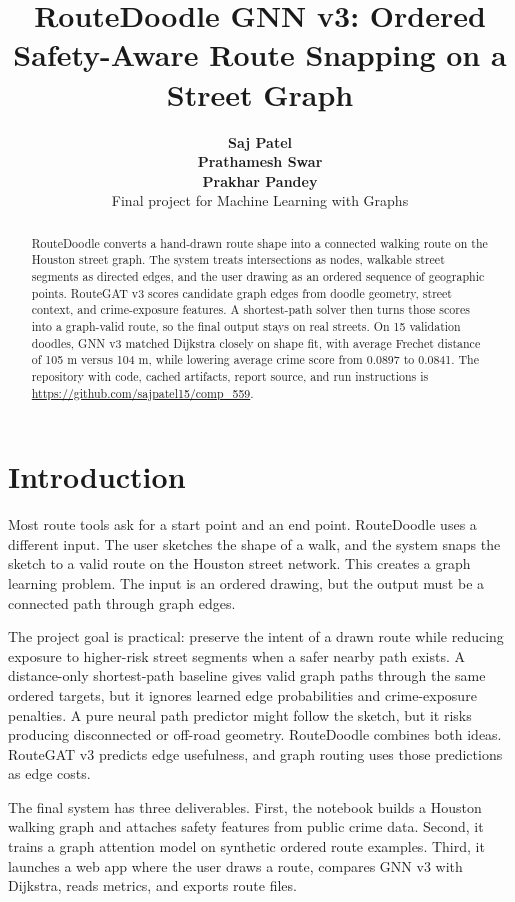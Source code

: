 \documentclass{article}
\title{RouteDoodle GNN v3: Ordered Safety-Aware Route Snapping on a Street Graph}
\author{%
  \textbf{Saj Patel} \\
  \textbf{Prathamesh Swar} \\
  \textbf{Prakhar Pandey} \\
  {\normalfont Final project for Machine Learning with Graphs}
}
\begin{document}
\maketitle

\begin{abstract}
RouteDoodle converts a hand-drawn route shape into a connected walking route on the Houston street graph. The system treats intersections as nodes, walkable street segments as directed edges, and the user drawing as an ordered sequence of geographic points. RouteGAT v3 scores candidate graph edges from doodle geometry, street context, and crime-exposure features. A shortest-path solver then turns those scores into a graph-valid route, so the final output stays on real streets. On 15 validation doodles, GNN v3 matched Dijkstra closely on shape fit, with average Frechet distance of 105 m versus 104 m, while lowering average crime score from 0.0897 to 0.0841. The repository with code, cached artifacts, report source, and run instructions is \url{https://github.com/sajpatel15/comp_559}.
\end{abstract}

\section{Introduction}

Most route tools ask for a start point and an end point. RouteDoodle uses a different input. The user sketches the shape of a walk, and the system snaps the sketch to a valid route on the Houston street network. This creates a graph learning problem. The input is an ordered drawing, but the output must be a connected path through graph edges.

The project goal is practical: preserve the intent of a drawn route while reducing exposure to higher-risk street segments when a safer nearby path exists. A distance-only shortest-path baseline gives valid graph paths through the same ordered targets, but it ignores learned edge probabilities and crime-exposure penalties. A pure neural path predictor might follow the sketch, but it risks producing disconnected or off-road geometry. RouteDoodle combines both ideas. RouteGAT v3 predicts edge usefulness, and graph routing uses those predictions as edge costs.

The final system has three deliverables. First, the notebook builds a Houston walking graph and attaches safety features from public crime data. Second, it trains a graph attention model on synthetic ordered route examples. Third, it launches a web app where the user draws a route, compares GNN v3 with Dijkstra, reads metrics, and exports route files.
\end{document}

